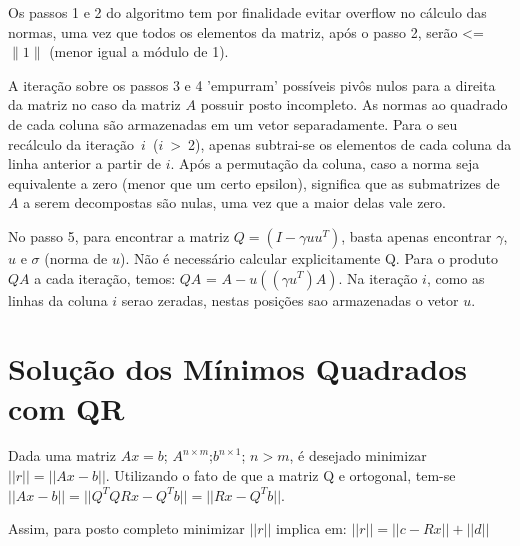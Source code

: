 Os passos 1 e 2 do algoritmo tem por finalidade evitar overflow no cálculo
das normas, uma vez que todos os elementos da matriz, após o passo 2, 
serão <= $\|1\|$ (menor igual a módulo de 1).

A iteração sobre os passos 3 e 4 'empurram' possíveis pivôs nulos para a direita 
da matriz no caso da matriz $A$ possuir posto incompleto. 
As normas ao quadrado de cada coluna são armazenadas em um vetor separadamente. Para
o seu recálculo da iteração~$i$~($i$~>~2), apenas subtrai-se os elementos de cada coluna da 
linha anterior a partir de $i$. Após a permutação da coluna, caso a norma seja equivalente
a zero (menor que um certo epsilon), significa que as submatrizes de $A$ a serem decompostas 
são nulas, uma vez que a maior delas vale zero.

No passo 5, para encontrar a matriz $Q = (I - \gamma uu^T)$, basta apenas encontrar
$\gamma$, $u$ e $\sigma$ (norma de $u$). Não é necessário calcular explicitamente Q. 
Para o produto $QA$ a cada iteração, temos: $QA$ = $A - u  ((\gamma  u^T)  A)$.
Na iteração $i$, como as linhas da coluna $i$ serao zeradas, nestas posições sao armazenadas
o vetor $u$.

\section{Solução dos Mínimos Quadrados com QR}
Dada uma matriz $Ax = b$; $A^{n \times m}$;$ b^{n \times 1}$; $n > m$,
é desejado minimizar  $||r|| = || Ax - b ||$.  Utilizando o fato
de que a matriz Q e ortogonal, tem-se  $|| Ax - b || = || Q^T QRx - Q^Tb || = || Rx - Q^Tb ||$.

Assim, para posto completo minimizar $||r||$ implica em:
$||r|| =  ||c - Rx|| + ||d||$
